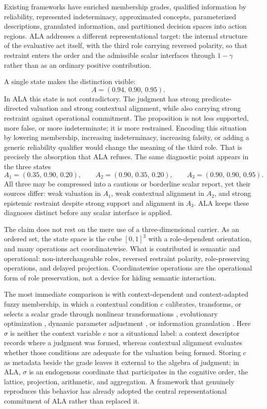 \documentclass[reqno,final]{amsart}
\theoremstyle{definition}
\theoremstyle{plain}
\theoremstyle{remark}
\begin{document}
Existing frameworks have enriched membership grades, qualified information by reliability, represented indeterminacy, approximated concepts, parameterized descriptions, granulated information, and partitioned decision spaces into action regions. ALA addresses a different representational target: the internal structure of the evaluative act itself, with the third role carrying reversed polarity, so that restraint enters the order and the admissible scalar interfaces through \(1-\gamma\) rather than as an ordinary positive contribution.

A single state makes the distinction visible:
\[
A=(0.94,\,0.90,\,0.95).
\]
In ALA this state is not contradictory. The judgment has strong predicate-directed valuation and strong contextual alignment, while also carrying strong restraint against operational commitment. The proposition is not less supported, more false, or more indeterminate; it is more restrained. Encoding this situation by lowering membership, increasing indeterminacy, increasing falsity, or adding a generic reliability qualifier would change the meaning of the third role. That is precisely the absorption that ALA refuses. The same diagnostic point appears in the three states
\[
A_1=(0.35,\,0.90,\,0.20),\qquad
A_2=(0.90,\,0.35,\,0.20),\qquad
A_3=(0.90,\,0.90,\,0.95).
\]
All three may be compressed into a cautious or borderline scalar report, yet their sources differ: weak valuation in \(A_1\), weak contextual alignment in \(A_2\), and strong epistemic restraint despite strong support and alignment in \(A_3\). ALA keeps these diagnoses distinct before any scalar interface is applied.

The claim does not rest on the mere use of a three-dimensional carrier. As an ordered set, the state space is the cube \([0,1]^3\) with a role-dependent orientation, and many operations act coordinatewise. What is contributed is semantic and operational: non-interchangeable roles, reversed restraint polarity, role-preserving operations, and delayed projection. Coordinatewise operations are the operational form of role preservation, not a device for hiding semantic interaction.

The most immediate comparison is with context-dependent and context-adapted fuzzy membership, in which a contextual condition \(c\) calibrates, transforms, or selects a scalar grade through nonlinear transformations \cite{PedryczGudwinGomide1997}, evolutionary optimization \cite{GudwinGomidePedrycz1998,Botta2009}, dynamic parameter adjustment \cite{Magdalena2002,HoGaribaldi2014}, or information granulation \cite{Zadeh1997,Yao2001}. Here \(\sigma\) is neither the context variable \(c\) nor a situational label: a context descriptor records where a judgment was formed, whereas contextual alignment evaluates whether those conditions are adequate for the valuation being formed. Storing \(c\) as metadata beside the grade leaves it external to the algebra of judgment; in ALA, \(\sigma\) is an endogenous coordinate that participates in the cognitive order, the lattice, projection, arithmetic, and aggregation. A framework that genuinely reproduces this behavior has already adopted the central representational commitment of ALA rather than replaced it.
\end{document}
